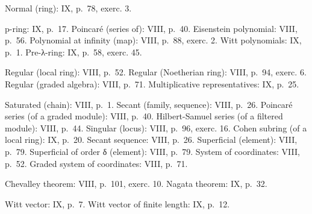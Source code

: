 Normal (ring): IX, p.~78, exerc. 3.

p-ring: IX, p.~17. Poincaré (series of): VIII, p.~40. Eisenstein polynomial: VIII, p.~56. Polynomial at infinity (map): VIII, p.~88, exerc. 2. Witt polynomials: IX, p.~1. Pre-λ-ring: IX, p.~58, exerc. 45.

Regular (local ring): VIII, p.~52. Regular (Noetherian ring): VIII, p.~94, exerc. 6. Regular (graded algebra): VIII, p.~71. Multiplicative representatives: IX, p.~25.

Saturated (chain): VIII, p.~1. Secant (family, sequence): VIII, p.~26. Poincaré series (of a graded module): VIII, p.~40. Hilbert-Samuel series (of a filtered module): VIII, p.~44. Singular (locus): VIII, p.~96, exerc. 16. Cohen subring (of a local ring): IX, p.~20. Secant sequence: VIII, p.~26. Superficial (element): VIII, p.~79. Superficial of order δ (element): VIII, p.~79. System of coordinates: VIII, p.~52. Graded system of coordinates: VIII, p.~71.

Chevalley theorem: VIII, p.~101, exerc. 10. Nagata theorem: IX, p.~32.

Witt vector: IX, p.~7. Witt vector of finite length: IX, p.~12.
